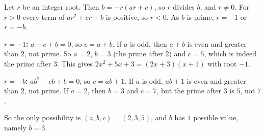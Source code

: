 Let $r$ be an integer root. Then $b=-r(ar+c)$, so $r$ divides $b$, and $r\ne0$. For $r>0$ every term of $ar^2+cr+b$ is positive, so $r<0$. As $b$ is prime, $r=-1$ or $r=-b$.

\textbf{$r=-1$:} $a-c+b=0$, so $c=a+b$. If $a$ is odd, then $a+b$ is even and greater than $2$, not prime. So $a=2$, $b=3$ (the prime after $2$) and $c=5$, which is indeed the prime after $3$. This gives $2x^2+5x+3=(2x+3)(x+1)$ with root $-1$.

\textbf{$r=-b$:} $ab^2-cb+b=0$, so $c=ab+1$. If $a$ is odd, $ab+1$ is even and greater than $2$, not prime. If $a=2$, then $b=3$ and $c=7$, but the prime after $3$ is $5$, not $7$.

So the only possibility is $(a,b,c)=(2,3,5)$, and $b$ has $\boxed{1}$ possible value, namely $b=3$.
